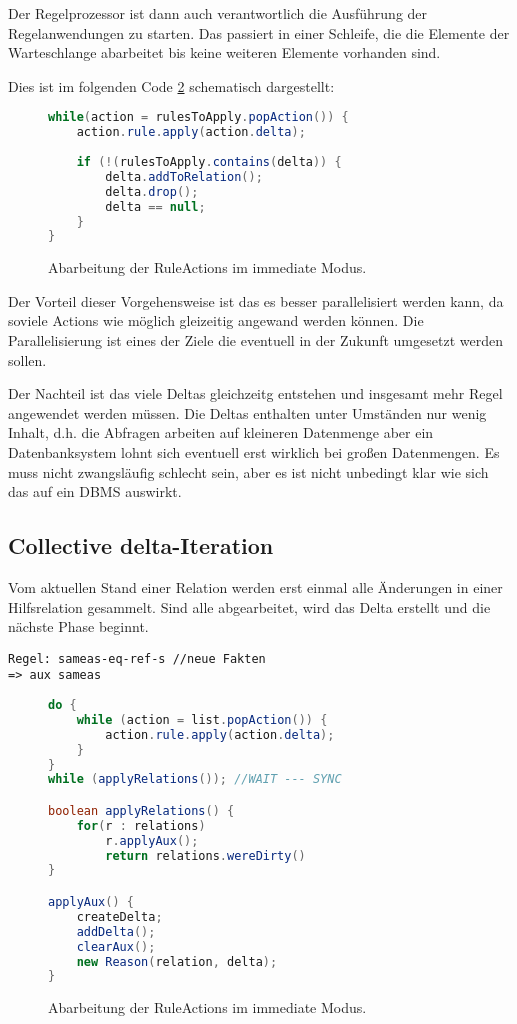 Der Regelprozessor ist dann auch verantwortlich die Ausführung der Regelanwendungen zu starten. Das passiert in einer Schleife, die die Elemente der Warteschlange abarbeitet bis keine weiteren Elemente vorhanden sind.

Dies ist im folgenden Code \ref{code-immediate-delta-iteration} schematisch dargestellt:

\begin{figure}[htp]
	\caption{Abarbeitung der RuleActions im immediate Modus.}
	\label{code-immediate-delta-iteration}
	\begin{lstlisting}[language=Java]
while(action = rulesToApply.popAction()) {
	action.rule.apply(action.delta);
	
	if (!(rulesToApply.contains(delta)) {
		delta.addToRelation();
		delta.drop();
		delta == null;
	}
}
	\end{lstlisting}
\end{figure}


Der Vorteil dieser Vorgehensweise ist das es besser parallelisiert werden kann, da soviele Actions wie möglich gleizeitig angewand werden können. Die Parallelisierung ist eines der Ziele die eventuell in der Zukunft umgesetzt werden sollen.

Der Nachteil ist das viele Deltas gleichzeitg entstehen und insgesamt mehr Regel angewendet werden müssen. Die Deltas enthalten unter Umständen nur wenig Inhalt, d.h. die Abfragen arbeiten auf kleineren Datenmenge aber ein Datenbanksystem lohnt sich eventuell erst wirklich bei großen Datenmengen. Es muss nicht zwangsläufig schlecht sein, aber es ist nicht unbedingt klar wie sich das auf ein DBMS auswirkt.

\subsection{Collective delta-Iteration}

Vom aktuellen Stand einer Relation werden erst einmal alle Änderungen in einer Hilfsrelation gesammelt. Sind alle abgearbeitet, wird das Delta erstellt und die nächste Phase beginnt.

\begin{verbatim}
Regel: sameas-eq-ref-s //neue Fakten
=> aux sameas
\end{verbatim}

\begin{figure}[htp]
	\caption{Abarbeitung der RuleActions im immediate Modus.}
	\label{code-immediate-delta-iteration}
	\begin{lstlisting}[language=Java]
do {
	while (action = list.popAction()) {
		action.rule.apply(action.delta);
	}
}
while (applyRelations()); //WAIT --- SYNC

boolean applyRelations() {
	for(r : relations)
		r.applyAux();
		return relations.wereDirty()
}

applyAux() {
	createDelta;
	addDelta();
	clearAux();
	new Reason(relation, delta);
}
	\end{lstlisting}
\end{figure}

